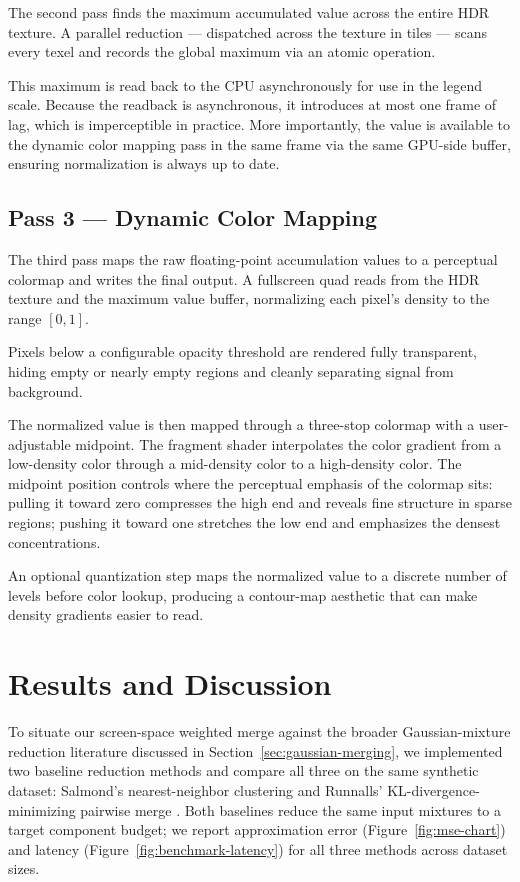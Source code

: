 \documentclass[10pt,conference]{IEEEtran}
\begin{document}
The second pass finds the maximum accumulated value across the entire HDR texture. A parallel reduction --- dispatched across the texture in tiles --- scans every texel and records the global maximum via an atomic operation.

This maximum is read back to the CPU asynchronously for use in the legend scale. Because the readback is asynchronous, it introduces at most one frame of lag, which is imperceptible in practice. More importantly, the value is available to the dynamic color mapping pass in the same frame via the same GPU-side buffer, ensuring normalization is always up to date.

\subsection{Pass 3 --- Dynamic Color Mapping}

The third pass maps the raw floating-point accumulation values to a perceptual colormap and writes the final output. A fullscreen quad reads from the HDR texture and the maximum value buffer, normalizing each pixel's density to the range $[0, 1]$.

Pixels below a configurable opacity threshold are rendered fully transparent, hiding empty or nearly empty regions and cleanly separating signal from background.

The normalized value is then mapped through a three-stop colormap with a user-adjustable midpoint. The fragment shader interpolates the color gradient from a low-density color through a mid-density color to a high-density color. The midpoint position controls where the perceptual emphasis of the colormap sits: pulling it toward zero compresses the high end and reveals fine structure in sparse regions; pushing it toward one stretches the low end and emphasizes the densest concentrations.

An optional quantization step maps the normalized value to a discrete number of levels before color lookup, producing a contour-map aesthetic that can make density gradients easier to read.


\section{Results and Discussion}

To situate our screen-space weighted merge against the broader Gaussian-mixture reduction literature discussed in Section~\ref{sec:gaussian-merging}, we implemented two baseline reduction methods and compare all three on the same synthetic dataset: Salmond's nearest-neighbor clustering \cite{Salmond2009} and Runnalls' KL-divergence-minimizing pairwise merge \cite{4383588}. Both baselines reduce the same input mixtures to a target component budget; we report approximation error (Figure~\ref{fig:mse-chart}) and latency (Figure~\ref{fig:benchmark-latency}) for all three methods across dataset sizes.
\end{document}
